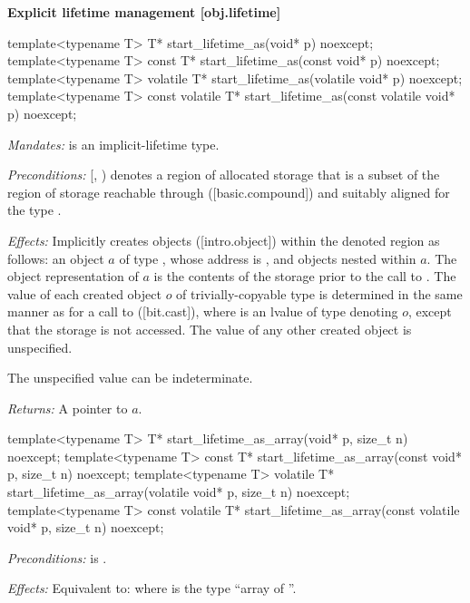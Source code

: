 \begin{addedblock}
\textbf{Explicit lifetime management \hspace{83mm}[obj.lifetime]}

\begin{codeblock}
template<typename T>
  T* start_lifetime_as(void* p) noexcept;
template<typename T>
  const T* start_lifetime_as(const void* p) noexcept;
template<typename T>
  volatile T* start_lifetime_as(volatile void* p) noexcept;
template<typename T>
  const volatile T* start_lifetime_as(const volatile void* p) noexcept;
\end{codeblock}

\begin{adjustwidth}{0.5cm}{0.5cm}
\emph{Mandates:}  is an implicit-lifetime type.

\emph{Preconditions:} [, ) denotes a region of allocated storage that is a subset of the region of storage reachable through ([basic.compound])  and suitably aligned for the type .

\emph{Effects:} Implicitly creates objects ([intro.object]) within the denoted region as follows: an object $a$ of type , whose address is , and objects nested within $a$. The object representation of $a$ is the contents of the storage prior to the call to . The value of each created object $o$ of trivially-copyable type  is determined in the same manner as for a call to  ([bit.cast]), where  is an lvalue of type  denoting $o$, except that the storage is not accessed. The value of any other created object is unspecified. \begin{note}The unspecified value can be indeterminate.\end{note}

\emph{Returns:} A pointer to $a$.
\end{adjustwidth}

\begin{codeblock}
template<typename T>
  T* start_lifetime_as_array(void* p, size_t n) noexcept;
template<typename T>
  const T* start_lifetime_as_array(const void* p, size_t n) noexcept;
template<typename T>
  volatile T* start_lifetime_as_array(volatile void* p, size_t n) noexcept;
template<typename T>
  const volatile T* start_lifetime_as_array(const volatile void* p, size_t n) noexcept;
\end{codeblock}

\begin{adjustwidth}{0.5cm}{0.5cm}
\emph{Preconditions:}  is .

\emph{Effects:} Equivalent to:  where  is the type ``array of  ''.
\end{adjustwidth}

\end{addedblock}

